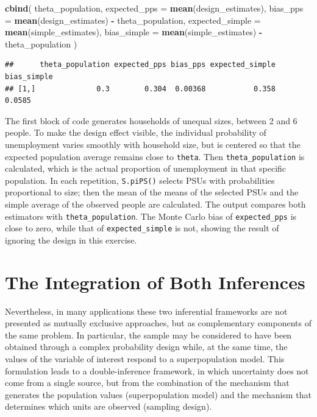 \documentclass[
  english,
  12pt,
]{book}
\newenvironment{Shaded}{\begin{snugshade}}{\end{snugshade}}
\newcommand{\AttributeTok}[1]{\textcolor[rgb]{0.13,0.29,0.53}{#1}}
\newcommand{\FunctionTok}[1]{\textcolor[rgb]{0.13,0.29,0.53}{\textbf{#1}}}
\newcommand{\NormalTok}[1]{#1}
\newcommand{\SpecialCharTok}[1]{\textcolor[rgb]{0.81,0.36,0.00}{\textbf{#1}}}
\begin{document}
\begin{Shaded}
\begin{Highlighting}[]
\FunctionTok{cbind}\NormalTok{(}
\NormalTok{  theta\_population,}
  \AttributeTok{expected\_pps =} \FunctionTok{mean}\NormalTok{(design\_estimates),}
  \AttributeTok{bias\_pps =} \FunctionTok{mean}\NormalTok{(design\_estimates) }\SpecialCharTok{{-}}\NormalTok{ theta\_population,}
  \AttributeTok{expected\_simple =} \FunctionTok{mean}\NormalTok{(simple\_estimates),}
  \AttributeTok{bias\_simple =} \FunctionTok{mean}\NormalTok{(simple\_estimates) }\SpecialCharTok{{-}}\NormalTok{ theta\_population}
\NormalTok{)}
\end{Highlighting}
\end{Shaded}

\begin{verbatim}
##      theta_population expected_pps bias_pps expected_simple bias_simple
## [1,]              0.3        0.304  0.00368           0.358      0.0585
\end{verbatim}

The first block of code generates households of unequal sizes, between 2 and 6 people. To make the design effect visible, the individual probability of unemployment varies smoothly with household size, but is centered so that the expected population average remains close to \texttt{theta}. Then \texttt{theta\_population} is calculated, which is the actual proportion of unemployment in that specific population. In each repetition, \texttt{S.piPS()} selects PSUs with probabilities proportional to size; then the mean of the means of the selected PSUs and the simple average of the observed people are calculated. The output compares both estimators with \texttt{theta\_population}. The Monte Carlo bias of \texttt{expected\_pps} is close to zero, while that of \texttt{expected\_simple} is not, showing the result of ignoring the design in this exercise.

\section{The Integration of Both Inferences}\label{la-integracion-de-ambas-inferencias}

Nevertheless, in many applications these two inferential frameworks are not presented as mutually exclusive approaches, but as complementary components of the same problem. In particular, the sample may be considered to have been obtained through a complex probability design while, at the same time, the values of the variable of interest respond to a superpopulation model. This formulation leads to a double-inference framework, in which uncertainty does not come from a single source, but from the combination of the mechanism that generates the population values (superpopulation model) and the mechanism that determines which units are observed (sampling design).
\end{document}
